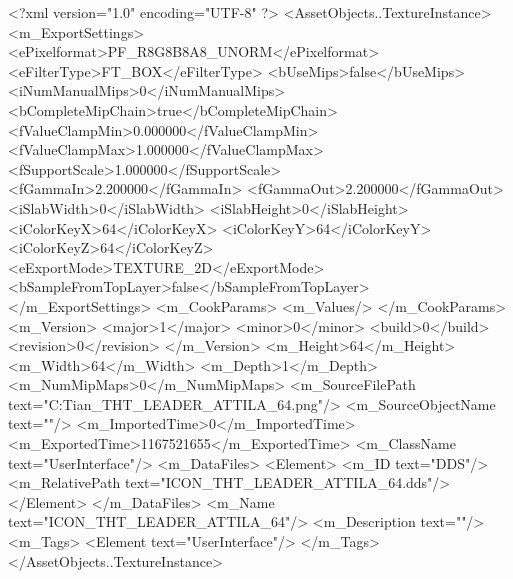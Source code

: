 <?xml version="1.0" encoding="UTF-8" ?>
<AssetObjects..TextureInstance>
	<m_ExportSettings>
		<ePixelformat>PF_R8G8B8A8_UNORM</ePixelformat>
		<eFilterType>FT_BOX</eFilterType>
		<bUseMips>false</bUseMips>
		<iNumManualMips>0</iNumManualMips>
		<bCompleteMipChain>true</bCompleteMipChain>
		<fValueClampMin>0.000000</fValueClampMin>
		<fValueClampMax>1.000000</fValueClampMax>
		<fSupportScale>1.000000</fSupportScale>
		<fGammaIn>2.200000</fGammaIn>
		<fGammaOut>2.200000</fGammaOut>
		<iSlabWidth>0</iSlabWidth>
		<iSlabHeight>0</iSlabHeight>
		<iColorKeyX>64</iColorKeyX>
		<iColorKeyY>64</iColorKeyY>
		<iColorKeyZ>64</iColorKeyZ>
		<eExportMode>TEXTURE_2D</eExportMode>
		<bSampleFromTopLayer>false</bSampleFromTopLayer>
	</m_ExportSettings>
	<m_CookParams>
		<m_Values/>
	</m_CookParams>
	<m_Version>
		<major>1</major>
		<minor>0</minor>
		<build>0</build>
		<revision>0</revision>
	</m_Version>
	<m_Height>64</m_Height>
	<m_Width>64</m_Width>
	<m_Depth>1</m_Depth>
	<m_NumMipMaps>0</m_NumMipMaps>
	<m_SourceFilePath text="C:\Users\Troy Tian\Downloads\ICON_THT_LEADER_ATTILA_64.png"/>
	<m_SourceObjectName text=""/>
	<m_ImportedTime>0</m_ImportedTime>
	<m_ExportedTime>1167521655</m_ExportedTime>
	<m_ClassName text="UserInterface"/>
	<m_DataFiles>
		<Element>
			<m_ID text="DDS"/>
			<m_RelativePath text="ICON_THT_LEADER_ATTILA_64.dds"/>
		</Element>
	</m_DataFiles>
	<m_Name text="ICON_THT_LEADER_ATTILA_64"/>
	<m_Description text=""/>
	<m_Tags>
		<Element text="UserInterface"/>
	</m_Tags>
</AssetObjects..TextureInstance>

